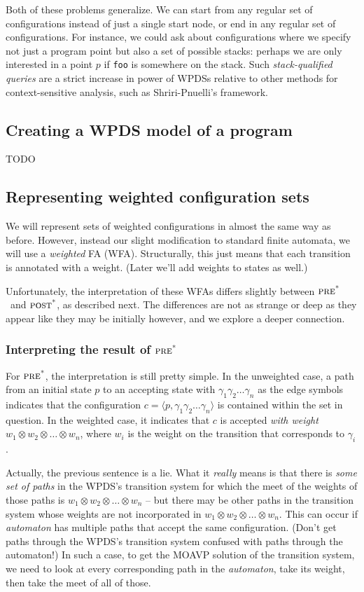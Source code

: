 \documentclass{article}
\newcommand{\Code}[1]{\texttt{#1}}
\newcommand{\Config}[2]{\ensuremath{\langle #1, #2 \rangle}}
\newcommand{\extend}{\otimes}
\newcommand{\poststar}{\ensuremath{\textsc{post}^\textsc{*}}}
\newcommand{\prestar}{\ensuremath{\textsc{pre}^\textsc{*}}}
\begin{document}
Both of these problems generalize. We can start from any regular set
of configurations instead of just a single start node, or end in any
regular set of configurations. For instance, we could ask about
configurations where we specify not just a program point but also a
set of possible stacks: perhaps we are only interested in a point $p$
if \Code{foo} is somewhere on the stack.  Such \emph{stack-qualified
  queries} are a strict increase in power of WPDSs relative to other
methods for context-sensitive analysis, such as Shriri-Pnuelli's
framework.


\subsection{Creating a WPDS model of a program}

TODO


\subsection{Representing weighted configuration sets}

We will represent sets of weighted configurations in almost the same
way as before. However, instead our slight modification to standard
finite automata, we will use a \emph{weighted} FA (WFA). Structurally,
this just means that each transition is annotated with a
weight\footnotemark. (Later we'll add weights to states as well.)

Unfortunately, the interpretation of these WFAs differs slightly
between \prestar\ and \poststar, as described next. The differences
are not as strange or deep as they appear like they may be initially
however, and we explore a deeper connection.

\subsubsection{Interpreting the result of \prestar}
For \prestar, the interpretation is still pretty simple. In the unweighted
case, a path from an initial state $p$ to an accepting state with
$\gamma_1\gamma_2\dots\gamma_n$ as the edge symbols indicates that the
configuration $c = \Config{p}{\gamma_1\gamma_2\dots\gamma_n}$ is
contained within the set in question. In the weighted case, it
indicates that $c$ is accepted \emph{with weight} $w_1 \extend w_2
\extend \dots \extend w_n$, where $w_i$ is the weight on the
transition that corresponds to $\gamma_i$.

Actually, the previous sentence is a lie. What it \emph{really} means
is that there is \emph{some set of paths} in the WPDS's transition
system for which the meet of the weights of those paths is $w_1
\extend w_2 \extend \dots \extend w_n$ -- but there may be other paths
in the transition system whose weights are not incorporated in $w_1
\extend w_2 \extend \dots \extend w_n$. This can occur if
\emph{automaton} has multiple paths that accept the same
configuration. (Don't get paths through the WPDS's transition system
confused with paths through the automaton!) In such a case, to get the
MOAVP solution of the transition system, we need to look at every
corresponding path in the \emph{automaton}, take its weight, then take
the meet of all of those.
\end{document}
